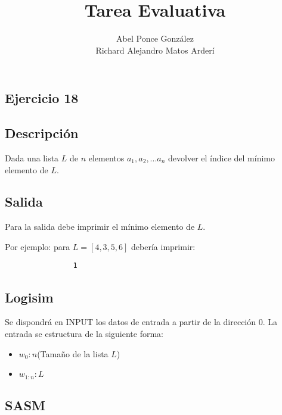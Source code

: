 \documentclass[a4paper]{article}
\title{Tarea Evaluativa }
\author{Abel Ponce González\\
	Richard Alejandro Matos Arderí	
}
\begin{document}
	\maketitle
	
	\begin{flushleft}
	
      		\section{Ejercicio 18}
      		
      		
      		\subsection*{Descripción}
      		
      		Dada una lista $L$ de $n$ elementos $a_{1}, a_{2}, ... a_{n}$ devolver el índice del mínimo elemento de $L$.
      		
      		\subsection*{Salida}
      		
      		Para la salida debe imprimir el mínimo elemento de $L$.
      		
      		Por ejemplo: para $L = [4, 3, 5, 6]$ debería imprimir: 
      		
      		\begin{lstlisting}
      			1
      		\end{lstlisting}      		
      		
      		\subsection*{Logisim}
      		
      		Se dispondrá en INPUT los datos de entrada a partir de la dirección 0. La entrada se estructura de la siguiente forma:
      		
      		\begin{itemize}
      			
      			\item $w_{0}: n $(Tamaño de la lista $L$)
      			\item $w_{1:n} : L$
      		\end{itemize}
      		
      		\subsection*{SASM}
      		

\end{flushleft}
\end{document}

